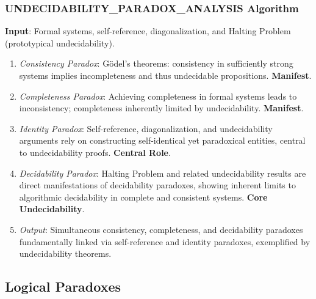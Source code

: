 \documentclass{article}
\begin{document}
	\subsubsection{UNDECIDABILITY\_PARADOX\_ANALYSIS Algorithm}
	\textbf{Input}: Formal systems, self-reference, diagonalization, and Halting Problem (prototypical undecidability).
	\begin{enumerate}
		\item \textit{Consistency Paradox}: Gödel's theorems: consistency in sufficiently strong systems implies incompleteness and thus undecidable propositions. \textbf{Manifest}.
		\item \textit{Completeness Paradox}: Achieving completeness in formal systems leads to inconsistency; completeness inherently limited by undecidability. \textbf{Manifest}.
		\item \textit{Identity Paradox}: Self-reference, diagonalization, and undecidability arguments rely on constructing self-identical yet paradoxical entities, central to undecidability proofs. \textbf{Central Role}.
		\item \textit{Decidability Paradox}: Halting Problem and related undecidability results are direct manifestations of decidability paradoxes, showing inherent limits to algorithmic decidability in complete and consistent systems. \textbf{Core Undecidability}.
		\item \textit{Output}: Simultaneous consistency, completeness, and decidability paradoxes fundamentally linked via self-reference and identity paradoxes, exemplified by undecidability theorems.
	\end{enumerate}
	
	
	\subsection{Logical Paradoxes}
	
\end{document}
